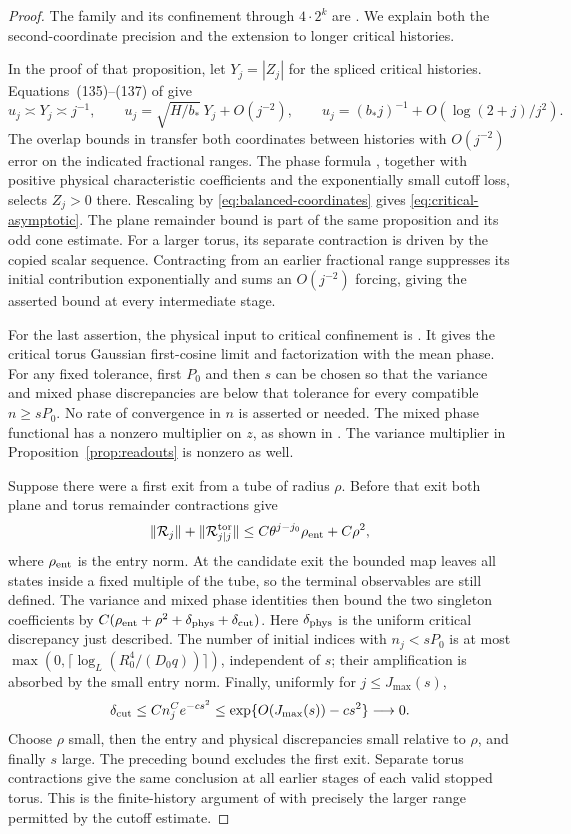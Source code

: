 \begin{proof}
The family and its confinement through $4\cdot2^k$ are
\cite[Proposition~5.1 and Lemma~5.5]{F}.  We explain both the
second-coordinate precision and the extension to longer critical
histories.

In the proof of that proposition, let $Y_j=|Z_j|$ for the spliced
critical histories.  Equations~(135)--(137) of \cite{F} give
\[
 u_j\asymp Y_j\asymp j^{-1},\qquad
 u_j=\sqrt{H/b_*}\,Y_j+O(j^{-2}),\qquad
 u_j=(b_*j)^{-1}+O(\log(2+j)/j^2).
\]
The overlap bounds in \cite[Lemma~5.7]{F} transfer both coordinates
between histories with $O(j^{-2})$ error on the indicated fractional
ranges.  The phase formula \cite[Equation~(130)]{F}, together with
positive physical characteristic coefficients and the exponentially
small cutoff loss, selects $Z_j>0$ there.  Rescaling by
\eqref{eq:balanced-coordinates} gives \eqref{eq:critical-asymptotic}.
The plane remainder bound is part of the same proposition and its odd
cone estimate.  For a larger torus, its separate contraction is driven
by the copied scalar sequence.  Contracting from an earlier fractional
range suppresses its initial contribution exponentially and sums an
$O(j^{-2})$ forcing, giving the asserted bound at every intermediate
stage.

For the last assertion, the physical input to critical confinement is
\cite[Lemma~5.4]{F}.  It gives the critical torus Gaussian first-cosine
limit and factorization with the mean phase.  For any fixed tolerance,
first $P_0$ and then $s$ can be chosen so that the variance and mixed
phase discrepancies are below that tolerance for every compatible
$n\ge sP_0$.  No rate of convergence in $n$ is asserted or needed.
The mixed phase functional has a nonzero multiplier on $z$, as shown
in \cite[Equations~(118)--(119)]{F}.  The variance multiplier in
Proposition~\ref{prop:readouts} is nonzero as well.

Suppose there were a first exit from a tube of radius $\rho$.
Before that exit both plane and torus remainder contractions give
\[
 \|\mathcal R_j\|+\|\mathcal R^{\rm tor}_{j|j}\|
                    \le C\theta^{j-j_0}\rho_{\rm ent}+C\rho^2,
\]
where $\rho_{\rm ent}$ is the entry norm.  At the candidate exit the
bounded map leaves all states inside a fixed multiple of the tube, so
the terminal observables are still defined.  The variance and mixed
phase identities then bound the two singleton coefficients by
$C(\rho_{\rm ent}+\rho^2+\delta_{\rm phys}+\delta_{\rm cut})$.
Here $\delta_{\rm phys}$ is the uniform critical discrepancy just
described.  The number of initial indices with $n_j<sP_0$ is at most
$\max(0,\lceil\log_L(R_0^4/(D_0q))\rceil)$, independent of $s$;
their amplification is absorbed by the small entry norm.
Finally, uniformly for $j\le J_{\max}(s)$,
\[
 \delta_{\rm cut}\le Cn_j^Ce^{-cs^2}
           \le \exp\{O(J_{\max}(s))-cs^2\}\longrightarrow0.
\]
Choose $\rho$ small, then the entry and physical discrepancies small
relative to $\rho$, and finally $s$ large.  The preceding bound
excludes the first exit.  Separate torus contractions give the same
conclusion at all earlier stages of each valid stopped torus.  This is
the finite-history argument of \cite[Lemma~5.5]{F} with precisely the
larger range permitted by the cutoff estimate.
\end{proof}
